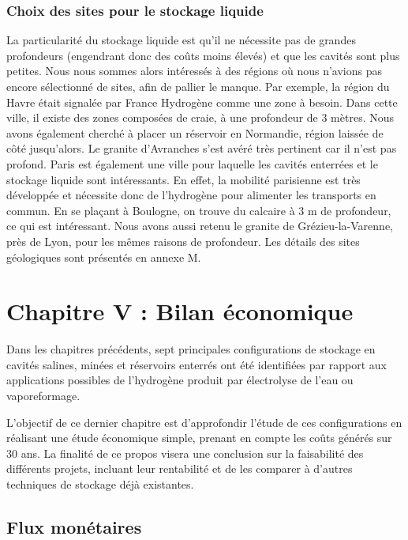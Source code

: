 \documentclass[11pt,french,a4paper]{article}
\begin{document}
\subsubsection{Choix des sites pour le stockage liquide}
La particularité du stockage liquide est qu’il ne nécessite pas de grandes profondeurs (engendrant donc des coûts moins élevés) et que les cavités sont plus petites. 
Nous nous sommes alors intéressés à des régions où nous n’avions pas encore sélectionné de sites, afin de pallier le manque. Par exemple, la région du Havre était signalée par France Hydrogène comme une zone à besoin. Dans cette ville, il existe des zones composées de craie, à une profondeur de 3 mètres. Nous avons également cherché à placer un réservoir en Normandie, région laissée de côté jusqu’alors. Le granite d’Avranches s’est avéré très pertinent car il n’est pas profond.
Paris est également une ville pour laquelle les cavités enterrées et le stockage liquide sont intéressants. En effet, la mobilité parisienne est très développée et nécessite donc de l’hydrogène pour alimenter les transports en commun. En se plaçant à Boulogne, on trouve du calcaire à 3 m de profondeur, ce qui est intéressant. 
Nous avons aussi retenu le granite de Grézieu-la-Varenne, près de Lyon, pour les mêmes raisons de profondeur. Les détails des sites géologiques sont présentés en annexe M.







\section{Chapitre V : Bilan économique}
Dans les chapitres précédents, sept principales configurations de stockage en cavités salines, minées et réservoirs enterrés ont été identifiées par rapport aux applications possibles de l'hydrogène produit par électrolyse de l’eau ou vaporeformage.

L’objectif de ce dernier chapitre est d’approfondir l’étude de ces configurations en réalisant une étude économique simple, prenant en compte les coûts générés sur 30 ans. La finalité de ce propos visera une conclusion sur la faisabilité des différents projets, incluant leur rentabilité et de les comparer à d’autres techniques de stockage déjà existantes.

\subsection{Flux monétaires}
\end{document}

